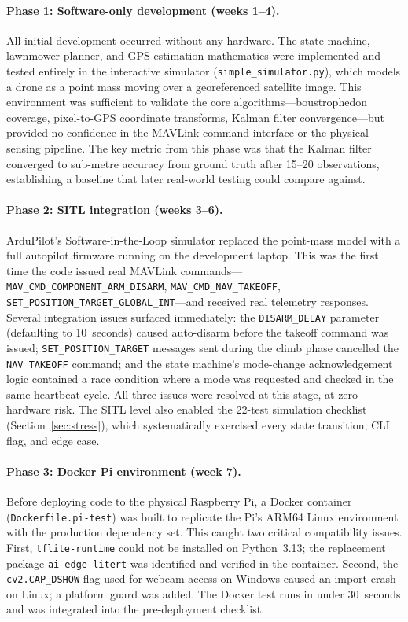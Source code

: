 \paragraph{Phase 1: Software-only development (weeks 1--4).}
All initial development occurred without any hardware.  The state machine, lawnmower planner, and GPS estimation mathematics were implemented and tested entirely in the interactive simulator (\texttt{simple\_simulator.py}), which models a drone as a point mass moving over a georeferenced satellite image.  This environment was sufficient to validate the core algorithms---boustrophedon coverage, pixel-to-GPS coordinate transforms, Kalman filter convergence---but provided no confidence in the MAVLink command interface or the physical sensing pipeline.  The key metric from this phase was that the Kalman filter converged to sub-metre accuracy from ground truth after 15--20 observations, establishing a baseline that later real-world testing could compare against.

\paragraph{Phase 2: SITL integration (weeks 3--6).}
ArduPilot's Software-in-the-Loop simulator replaced the point-mass model with a full autopilot firmware running on the development laptop.  This was the first time the code issued real MAVLink commands---\texttt{MAV\_CMD\_COMPONENT\_ARM\_DISARM}, \texttt{MAV\_CMD\_NAV\_TAKEOFF}, \texttt{SET\_POSITION\_TARGET\_GLOBAL\_INT}---and received real telemetry responses.  Several integration issues surfaced immediately: the \texttt{DISARM\_DELAY} parameter (defaulting to 10~seconds) caused auto-disarm before the takeoff command was issued; \texttt{SET\_POSITION\_TARGET} messages sent during the climb phase cancelled the \texttt{NAV\_TAKEOFF} command; and the state machine's mode-change acknowledgement logic contained a race condition where a mode was requested and checked in the same heartbeat cycle.  All three issues were resolved at this stage, at zero hardware risk.  The SITL level also enabled the 22-test simulation checklist (Section~\ref{sec:stress}), which systematically exercised every state transition, CLI flag, and edge case.

\paragraph{Phase 3: Docker Pi environment (week 7).}
Before deploying code to the physical Raspberry Pi, a Docker container (\texttt{Dockerfile.pi-test}) was built to replicate the Pi's ARM64 Linux environment with the production dependency set.  This caught two critical compatibility issues.  First, \texttt{tflite-runtime} could not be installed on Python~3.13; the replacement package \texttt{ai-edge-litert} was identified and verified in the container.  Second, the \texttt{cv2.CAP\_DSHOW} flag used for webcam access on Windows caused an import crash on Linux; a platform guard was added.  The Docker test runs in under 30~seconds and was integrated into the pre-deployment checklist.

